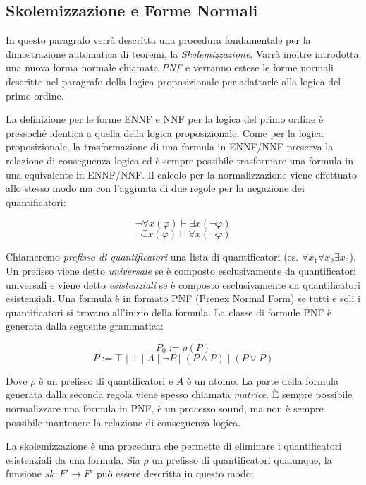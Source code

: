 \documentclass[./main.tex]{subfiles}
\begin{document}

\subsection{Skolemizzazione e Forme Normali}
In questo paragrafo verrà descritta una procedura fondamentale per la dimostrazione automatica di teoremi, la \textit{Skolemizzazione}. Varrà inoltre introdotta
una nuova forma normale chiamata \textit{PNF} e verranno
estese le forme normali descritte nel paragrafo della logica proposizionale per adattarle alla logica del primo ordine.


La definizione per le forme ENNF e NNF per la logica del primo ordine è pressoché identica a quella della logica proposizionale.
Come per la logica proposizionale, la trasformazione di una formula in ENNF/NNF preserva la relazione di conseguenza logica ed è sempre
possibile trasformare una formula in una equivalente in ENNF/NNF. 
Il calcolo per la normalizzazione viene effettuato allo stesso modo ma con l'aggiunta di due regole per la negazione dei quantificatori:

$$ \lnot \forall x (\varphi) \vdash \exists x (\lnot \varphi) $$
$$ \lnot \exists x (\varphi) \vdash \forall x (\lnot \varphi) $$


Chiameremo \textit{prefisso di quantificatori} una lista di quantificatori (es. $\forall x_1 \forall x_2 \exists x_3$). 
Un prefisso viene detto \textit{universale} se è composto esclusivamente da quantificatori universali e viene detto \textit{esistenziali} 
se è composto esclusivamente da quantificatori esistenziali. Una formula è in formato PNF (Prenex Normal Form) se tutti e soli 
i quantificatori si trovano all'inizio della formula. La classe di formule PNF è generata dalla seguente grammatica:

$$ P_0 := \rho(P) $$
$$ P := \top \mid \bot \mid A \mid \lnot P \mid (P \land P) \mid (P \lor P) $$

Dove $\rho$ è un prefisso di quantificatori e $A$ è un atomo.
La parte della formula generata dalla seconda regola viene spesso chiamata \textit{matrice}.
È sempre possibile normalizzare una formula in PNF, è un processo sound, ma non è sempre possibile mantenere la relazione di conseguenza logica.


La skolemizzazione è una procedura che permette di eliminare i quantificatori esistenziali da una formula. 
Sia $\rho$ un prefisso di quantificatori qualunque, la funzione $sk : F' \rightarrow F'$ può essere descritta in questo modo:
\end{document}
